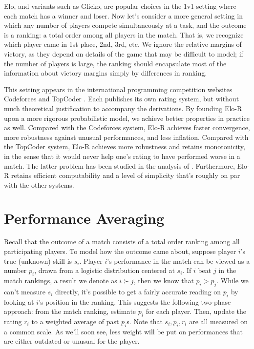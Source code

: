 \documentclass{article}
\begin{document}
Elo, and variants such as Glicko, are popular choices in the 1v1 setting where each match has a winner and loser. Now let's consider a more general setting in which any number of players compete simultaneously at a task, and the outcome is a ranking: a total order among all players in the match. That is, we recognize which player came in 1st place, 2nd, 3rd, etc. We ignore the relative margins of victory, as they depend on details of the game that may be difficult to model; if the number of players is large, the ranking should encapsulate most of the information about victory margins simply by differences in ranking.

This setting appears in the international programming competition websites Codeforces \cite{Codeforces} and TopCoder \cite{TopCoder}. Each publishes its own rating system, but without much theoretical justification to accompany the derivations. By founding Elo-R upon a more rigorous probabilistic model, we achieve better properties in practice as well. Compared with the Codeforces system, Elo-R achieves faster convergence, more robustness against unusual performances, and less inflation. Compared with the TopCoder system, Elo-R achieves more robustness and retains monotonicity, in the sense that it would never help one's rating to have performed worse in a match. The latter problem has been studied in the analysis of \cite{forivsektheoretical}. Furthermore, Elo-R retains efficient computability and a level of simplicity that's roughly on par with the other systems.

\section{Performance Averaging}

Recall that the outcome of a match consists of a total order ranking among all participating players. To model how the outcome came about, suppose player $i$'s true (unknown) skill is $s_i$. Player $i$'s performance in the match can be viewed as a number $p_i$, drawn from a logistic distribution centered at $s_i$. If $i$ beat $j$ in the match rankings, a result we denote as $i \succ j$, then we know that $p_i > p_j$. While we can't measure $s_i$ directly, it's possible to get a fairly accurate reading on $p_i$ by looking at $i$'s position in the ranking. This suggests the following two-phase approach: from the match ranking, estimate $p_i$ for each player. Then, update the rating $r_i$ to a weighted average of past $p_i$s. Note that $s_i,p_i,r_i$ are all measured on a common scale. As we'll soon see, less weight will be put on performances that are either outdated or unusual for the player.
\end{document}
